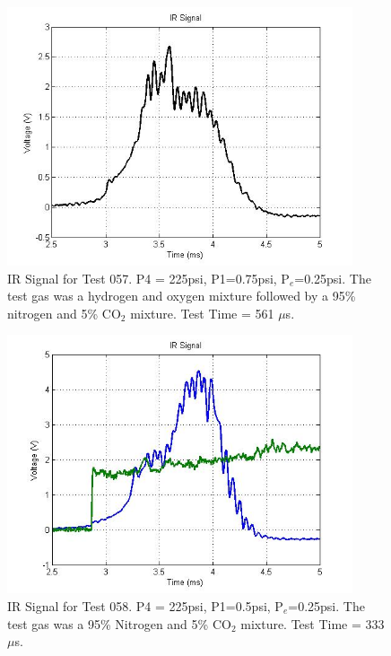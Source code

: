 \begin{figure}
\centering
\includegraphics[height = 3in]{Figures/H2.jpg}
\caption[IR Signal for Test 046]{IR Signal for Test 057. P4 = 225psi, P1=0.75psi, P$_e$=0.25psi. The test gas was a hydrogen and oxygen mixture followed by a 95\% nitrogen and 5\% CO$_2$ mixture. Test Time = 561 $\mu$s.}
\label{fig:IRTrace2}
\end{figure}

\begin{figure}
\centering
\includegraphics[height = 3in]{Figures/H2andCo2.jpg}
\caption[IR Signal for Test 046]{IR Signal for Test 058. P4 = 225psi, P1=0.5psi, P$_e$=0.25psi. The test gas was a 95\% Nitrogen and 5\% CO$_2$ mixture. Test Time = 333 $\mu$s.}
\label{fig:IRTrace3}
\end{figure}

